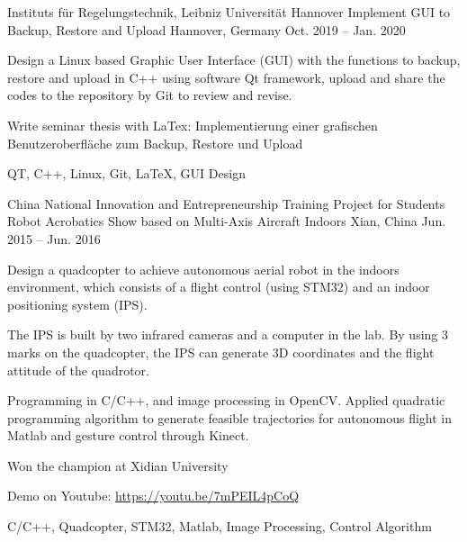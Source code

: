 
\begin{cventries}
\cventry
{Instituts für Regelungstechnik, Leibniz Universität Hannover} %
{Implement GUI to Backup, Restore and Upload} %
{Hannover, Germany} %
{Oct. 2019 – Jan. 2020} %
{
	\begin{cvitems} %
		\item {Design a Linux based Graphic User Interface (GUI) with the functions to backup, restore and upload in C++ using software Qt framework, upload and share the codes to the repository by Git to review and revise.}
		\item {Write seminar thesis with LaTex: Implementierung einer grafischen Benutzeroberfläche zum Backup, Restore und Upload}
	\end{cvitems}
	}
{QT, C++, Linux, Git, \LaTeX, GUI Design}

  \cventry
    {China National Innovation and Entrepreneurship Training Project for Students} 
    {Robot Acrobatics Show based on Multi-Axis Aircraft Indoors}
    {Xian, China} %
    {Jun. 2015 – Jun. 2016} %
    {
      \begin{cvitems} %
        \item {Design a quadcopter to achieve autonomous aerial robot in the indoors environment, which consists of a flight control (using STM32) and an indoor positioning system (IPS). }
        \item {The IPS is built by two infrared cameras and a computer in the lab. By using 3 marks on the quadcopter, the IPS can generate 3D coordinates and the flight attitude of the quadrotor. }
        \item {Programming in C/C++, and image processing in OpenCV. Applied quadratic programming algorithm to generate feasible trajectories for autonomous flight in Matlab and gesture control through Kinect.}
        \item {Won the champion at Xidian University}
        \item {Demo on Youtube:  \url{https://youtu.be/7mPEIL4pCoQ}}
      \end{cvitems}
    }
	{C/C++,  Quadcopter, STM32, Matlab, Image Processing, Control Algorithm }	


\end{cventries}
